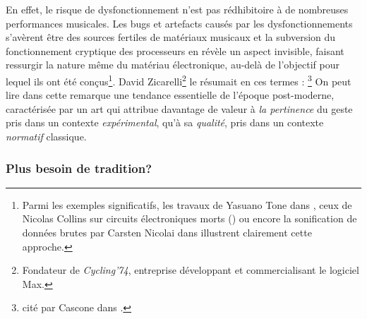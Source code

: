 \noindent En effet, le risque de dysfonctionnement n'est pas rédhibitoire à de nombreuses performances musicales. Les bugs et artefacts causés par les dysfonctionnements s'avèrent être des sources fertiles de matériaux musicaux et la subversion du fonctionnement cryptique des processeurs en révèle un aspect invisible, faisant ressurgir la nature même du matériau électronique, au-delà de l'objectif pour lequel ils ont été conçus\footnote{Parmi les exemples significatifs, les travaux de Yasuano Tone dans , ceux de Nicolas Collins sur circuits électroniques morts () ou encore la sonification de données brutes par Carsten Nicolai dans  illustrent clairement cette approche.}. David Zicarelli\footnote{Fondateur de \textit{Cycling'74}, entreprise développant et commercialisant le logiciel Max.} le résumait en ces termes : \footnote{ cité par Cascone dans \cite{cascone_aesthetics_2000}.} On peut lire dans cette remarque une tendance essentielle de l'époque post-moderne, caractérisée par un art qui attribue davantage de valeur à \textit{la pertinence} du geste pris dans un contexte \textit{expérimental}, qu'à sa \textit{qualité}, pris dans un contexte \textit{normatif} classique.

\subsubsection{Plus besoin de tradition?}

